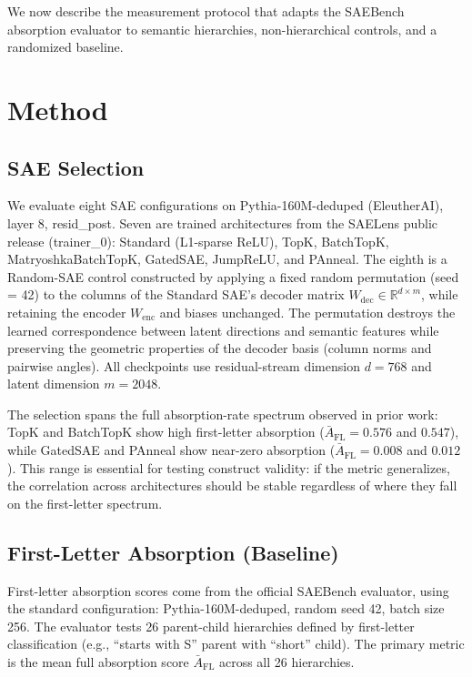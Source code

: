 \documentclass{article}
\begin{document}
We now describe the measurement protocol that adapts the SAEBench absorption evaluator to semantic hierarchies, non-hierarchical controls, and a randomized baseline.

\section{Method}

\subsection{SAE Selection}
\label{sec:sae_selection}

We evaluate eight SAE configurations on Pythia-160M-deduped (EleutherAI), layer 8, resid\_post. Seven are trained architectures from the SAELens public release (trainer\_0): Standard (L1-sparse ReLU), TopK, BatchTopK, MatryoshkaBatchTopK, GatedSAE, JumpReLU, and PAnneal. The eighth is a Random-SAE control constructed by applying a fixed random permutation (seed = 42) to the columns of the Standard SAE's decoder matrix $W_{\text{dec}} \in \mathbb{R}^{d \times m}$, while retaining the encoder $W_{\text{enc}}$ and biases unchanged. The permutation destroys the learned correspondence between latent directions and semantic features while preserving the geometric properties of the decoder basis (column norms and pairwise angles). All checkpoints use residual-stream dimension $d = 768$ and latent dimension $m = 2048$.

The selection spans the full absorption-rate spectrum observed in prior work: TopK and BatchTopK show high first-letter absorption ($\bar{A}_{\text{FL}} = 0.576$ and $0.547$), while GatedSAE and PAnneal show near-zero absorption ($\bar{A}_{\text{FL}} = 0.008$ and $0.012$). This range is essential for testing construct validity: if the metric generalizes, the correlation across architectures should be stable regardless of where they fall on the first-letter spectrum.

\subsection{First-Letter Absorption (Baseline)}
\label{sec:first_letter}

First-letter absorption scores come from the official SAEBench evaluator, using the standard configuration: Pythia-160M-deduped, random seed 42, batch size 256. The evaluator tests 26 parent-child hierarchies defined by first-letter classification (e.g., ``starts with S'' parent with ``short'' child). The primary metric is the mean full absorption score $\bar{A}_{\text{FL}}$ across all 26 hierarchies.
\end{document}

